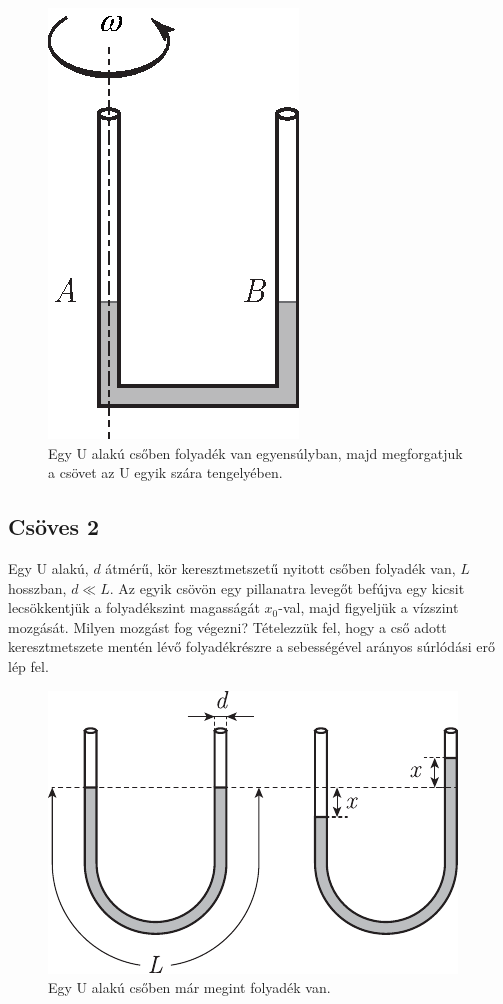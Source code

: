\documentclass[12pt,a4paper]{scrartcl}
\begin{document}
\begin{figure}[htb] 
\centering    
\includegraphics[scale=1]{figs/bernoUlli.eps}
\caption{Egy U alakú csőben folyadék van egyensúlyban, majd megforgatjuk a csövet az U egyik szára tengelyében.}
\label{fig:ucsoves}
\end{figure}
\FloatBarrier

\subsection{Csöves 2}
Egy U alakú, $d$ átmérű, kör keresztmetszetű nyitott csőben folyadék van, $L$ hosszban, $d \ll L$. Az egyik csövön egy pillanatra levegőt befújva egy kicsit lecsökkentjük a folyadékszint magasságát $x_0$-val, majd figyeljük a vízszint mozgását. Milyen mozgást fog végezni? Tételezzük fel, hogy a cső adott keresztmetszete mentén lévő folyadékrészre a sebességével arányos súrlódási erő lép fel.
\begin{figure}[htb] 
\centering    
\includegraphics[scale=1]{figs/ucsoves2.pdf}
\caption{Egy U alakú csőben már megint folyadék van.}
\label{fig:ucsoves2}
\end{figure}
\FloatBarrier

\fi
\end{document}
